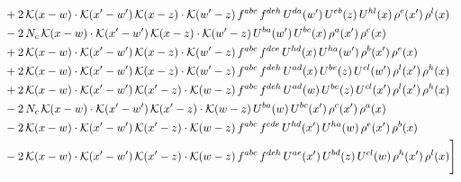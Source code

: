 \documentclass[9pt]{article}
\numberwithin{equation}{section}
\begin{document}
\begin{align}
&+2\,\mathcal{K}(x-w)\cdot\mathcal{K}(x'-w')\,\mathcal{K}(x-z)\cdot\mathcal{K}(w'-z)\,f^{abc}\,f^{deh}\,U^{da}(w')\,U^{eb}(z)\,U^{hl}(x)\,\rho^{c}(x')\,\rho^{l}(x)\notag\\
&-2\,N_{c}\,\mathcal{K}(x-w)\cdot\mathcal{K}(x'-w')\,\mathcal{K}(x-z)\cdot\mathcal{K}(w'-z)\,U^{ba}(w')\,U^{bc}(x)\,\rho^{a}(x')\,\rho^{c}(x)\notag\\
&+2\,\mathcal{K}(x-w)\cdot\mathcal{K}(x'-w')\,\mathcal{K}(x-z)\cdot\mathcal{K}(w'-z)\,f^{abc}\,f^{dce}\,U^{hd}(x)\,U^{ha}(w')\,\rho^{b}(x')\,\rho^{e}(x)\notag\\
&+2\,\mathcal{K}(x-w)\cdot\mathcal{K}(x'-w')\,\mathcal{K}(x-z)\cdot\mathcal{K}(w'-z)\,f^{abc}\,f^{deh}\,U^{ad}(x)\,U^{be}(z)\,U^{cl}(w')\,\rho^{l}(x')\,\rho^{h}(x)\notag\\
&+2\,\mathcal{K}(x-w)\cdot\mathcal{K}(x'-w')\,\mathcal{K}(x'-z)\cdot\mathcal{K}(w-z)\,f^{abc}\,f^{deh}\,U^{ad}(w)\,U^{be}(z)\,U^{cl}(x')\,\rho^{l}(x')\,\rho^{h}(x)\notag\\
&-2\,N_{c}\,\mathcal{K}(x-w)\cdot\mathcal{K}(x'-w')\,\mathcal{K}(x'-z)\cdot\mathcal{K}(w-z)\,U^{ba}(w)\,U^{bc}(x')\,\rho^{c}(x')\,\rho^{a}(x)\notag\\
&-2\,\mathcal{K}(x-w)\cdot\mathcal{K}(x'-w')\,\mathcal{K}(x'-z)\cdot\mathcal{K}(w-z)\,f^{abc}\,f^{cde}\,U^{hd}(x')\,U^{ha}(w)\,\rho^{e}(x')\,\rho^{b}(x)\notag\\
&-2\,\mathcal{K}(x-w)\cdot\mathcal{K}(x'-w')\,\mathcal{K}(x'-z)\cdot\mathcal{K}(w-z)\,f^{abc}\,f^{deh}\,U^{ae}(x')\,U^{bd}(z)\,U^{cl}(w)\,\rho^{h}(x')\,\rho^{l}(x)\Bigg]
\end{align}
\end{document}
